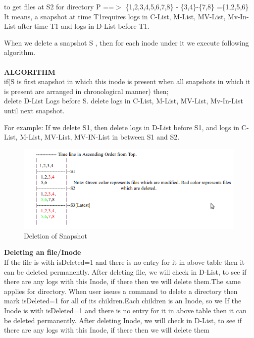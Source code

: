 to get files at S2 for directory P ==$>$ \{1,2,3,4,5,6,7,8\} - \{3,4\}-\{7,8\} =\{1,2,5,6\}
It means, a snapshot at time T1requires logs in C-List, M-List, MV-List, Mv-In-List after time T1 and logs in D-List before T1.

When we delete a snapshot S , then for each inode under it we execute following algorithm.\\\\
\textbf{ALGORITHM}\\
if(S is first snapshot in which this inode is present when all snapshots in which it is present are arranged in chronological manner) then;\\
\hspace{5em}delete D-List Logs before S. delete logs in C-List, M-List, MV-List, Mv-In-List until next snapshot.

For example: If we delete S1, then delete logs in D-List before S1, and logs in C-List, M-List, MV-List, MV-IN-List in between S1 and S2.\\

\begin{figure}[h!]
\centering  
 \includegraphics[scale=0.8]{figs/preliminar/Approach2.png}
  \caption{Deletion of Snapshot}
  \label{fig:approach2}
\end{figure}


\textbf{Deleting an file/Inode}\\
If the file is with isDeleted=1 and there is no entry for it in above table then it can be deleted permanently. After deleting file, we will check in D-List, to see if there are any logs with this Inode, if there then we will delete them.The same applies for directory. When user issues a command to delete a directory then mark isDeleted=1 for all of its children.Each children is an Inode, so we If the Inode is with isDeleted=1 and there is no entry for it in above table then it can be deleted permanently. After deleting Inode, we will check in D-List, to see if there are any logs with this Inode, if there then we will delete them

